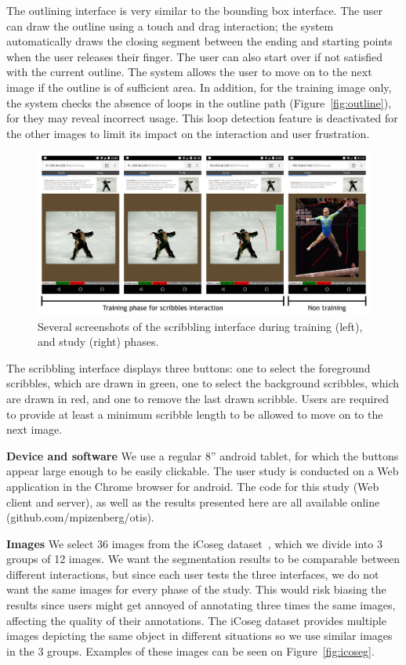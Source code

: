 The outlining interface is very similar to the bounding box interface.
The user can draw the outline using a touch and drag interaction;
the system automatically draws the closing segment between
the ending and starting points when the user releases their finger.
The user can also start over if not satisfied with the current outline.
The system allows the user to move on to the next image
if the outline is of sufficient area.
In addition, for the training image only,
the system checks the absence of loops in the outline path
(Figure~\ref{fig:outline}), for they may reveal incorrect usage.
This loop detection feature is deactivated for the other images
to limit its impact on the interaction and user frustration.


\begin{figure}[ht]
\includegraphics[width=\columnwidth]{assets/img/app_scribbles.jpg}
\caption{Several screenshots of the scribbling interface
during training (left), and study (right) phases.}%
\label{fig:scribbles}
\end{figure}


The scribbling interface displays three buttons:
one to select the foreground scribbles, which are drawn in green,
one to select the background scribbles, which are drawn in red,
and one to remove the last drawn scribble.
Users are required to provide at least a minimum scribble length
to be allowed to move on to the next image.


\textbf{Device and software}
We use a regular 8'' android tablet,
for which the buttons appear large enough to be easily clickable.
The user study is conducted on a Web application in the Chrome browser for android.
The code for this study (Web client and server),
as well as the results presented here are all available online
(github.com/mpizenberg/otis).


\textbf{Images}
We select 36 images from the iCoseg dataset~\cite{batra_icoseg:_2010},
which we divide into 3 groups of 12 images.
We want the segmentation results to be comparable between
different interactions, but since each user tests the three interfaces,
we do not want the same images for every phase of the study.
This would risk biasing the results since
users might get annoyed of annotating three times the same images,
affecting the quality of their annotations.
The iCoseg dataset provides multiple images depicting the same object
in different situations so we use similar images in the 3 groups.
Examples of these images can be seen on Figure~\ref{fig:icoseg}.


